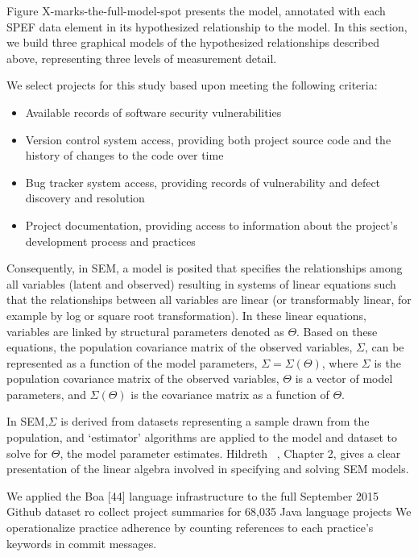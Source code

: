 Figure X-marks-the-full-model-spot presents the model, annotated with each SPEF data element in its hypothesized relationship to the model. 
In this section, we build three graphical models of the hypothesized relationships described above, representing three levels of measurement detail.




We select projects for this study based upon meeting the following criteria:
\begin{itemize}
	
	\item Available records of software security vulnerabilities
	\item Version control system access, providing both project source code and the history of changes to the code over time
	\item Bug tracker system access, providing records of vulnerability and defect discovery and resolution
	\item Project documentation, providing access to information about the project’s development process and practices
\end{itemize}

Consequently, in SEM, a model is posited that specifies the relationships among all variables (latent and observed) resulting in systems of linear equations such that the relationships between all variables are linear (or transformably linear, for example by log or square root transformation). In these linear equations, variables are linked by structural parameters denoted as $\Theta$. Based on these equations, the population covariance matrix of the observed variables, $\Sigma$, can be represented as a function of the model parameters, $\Sigma=\Sigma(\Theta)$, where $\Sigma$ is the population covariance matrix of the observed variables, $\Theta$ is a vector of model parameters,  and $\Sigma(\Theta)$ is the covariance matrix as a function of $\Theta$. 

In SEM,$\Sigma$ is derived from datasets representing a sample drawn from the population, and `estimator' algorithms are applied to the model and dataset to solve for $\Theta$, the model parameter estimates. Hildreth ~\cite{hildreth2013residual}, Chapter 2, gives a clear presentation of the linear algebra involved in specifying and solving SEM models. 

We applied the Boa [44] language infrastructure to the full September 2015 Github dataset ro collect project summaries for 68,035 Java language projects We operationalize practice adherence by counting references to each practice’s keywords in commit messages. 


